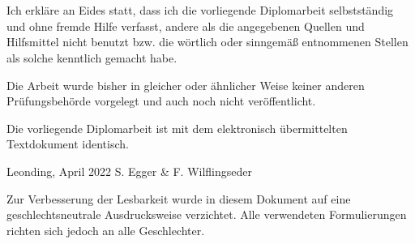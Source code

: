 \thispagestyle{empty}
\vspace{3cm}
~ \\ \\
Ich erkläre an Eides statt, dass ich die vorliegende Diplomarbeit selbstständig und ohne fremde Hilfe verfasst, andere als die angegebenen Quellen und Hilfsmittel nicht benutzt bzw. die wörtlich oder sinngemäß entnommenen Stellen als solche kenntlich gemacht habe.

Die Arbeit wurde bisher in gleicher oder ähnlicher Weise keiner anderen Prüfungsbehörde vorgelegt und auch noch nicht veröffentlicht.

Die vorliegende Diplomarbeit ist mit dem elektronisch übermittelten Textdokument identisch.
\vspace{3cm}
\begin{tabbing}
Leonding, April 2022 \hspace{5cm} S. Egger \& F. Wilflingseder
\end{tabbing}
\vspace{10cm}
Zur Verbesserung der Lesbarkeit wurde in diesem Dokument auf eine geschlechtsneutrale Ausdrucksweise verzichtet.
Alle verwendeten Formulierungen richten sich jedoch an alle Geschlechter.
\newpage
\setcounter{page}{1}
